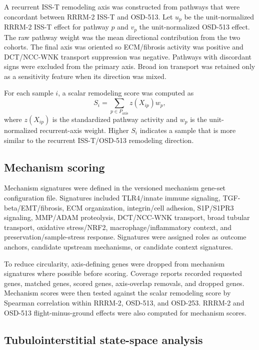 \documentclass[11pt]{article}
\begin{document}
A recurrent ISS-T remodeling axis was constructed from pathways that were concordant between RRRM-2 ISS-T and OSD-513. Let $u_p$ be the unit-normalized RRRM-2 ISS-T effect for pathway $p$ and $v_p$ the unit-normalized OSD-513 effect. The raw pathway weight was the mean directional contribution from the two cohorts. The final axis was oriented so ECM/fibrosis activity was positive and DCT/NCC-WNK transport suppression was negative. Pathways with discordant signs were excluded from the primary axis. Broad ion transport was retained only as a sensitivity feature when its direction was mixed.

For each sample $i$, a scalar remodeling score was computed as
\begin{equation}
S_i = \sum_{p\in P_{\mathrm{axis}}} z(X_{ip})w_p,
\end{equation}
where $z(X_{ip})$ is the standardized pathway activity and $w_p$ is the unit-normalized recurrent-axis weight. Higher $S_i$ indicates a sample that is more similar to the recurrent ISS-T/OSD-513 remodeling direction.

\subsection{Mechanism scoring}

Mechanism signatures were defined in the versioned mechanism gene-set configuration file. Signatures included TLR4/innate immune signaling, TGF-beta/EMT/fibrosis, ECM organization, integrin/cell adhesion, S1P/S1PR3 signaling, MMP/ADAM proteolysis, DCT/NCC-WNK transport, broad tubular transport, oxidative stress/NRF2, macrophage/inflammatory context, and preservation/sample-stress response. Signatures were assigned roles as outcome anchors, candidate upstream mechanisms, or candidate context signatures.

To reduce circularity, axis-defining genes were dropped from mechanism signatures where possible before scoring. Coverage reports recorded requested genes, matched genes, scored genes, axis-overlap removals, and dropped genes. Mechanism scores were then tested against the scalar remodeling score by Spearman correlation within RRRM-2, OSD-513, and OSD-253. RRRM-2 and OSD-513 flight-minus-ground effects were also computed for mechanism scores.

\subsection{Tubulointerstitial state-space analysis}
\end{document}
